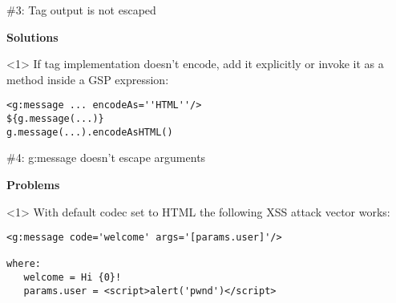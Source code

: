 \begin{frame}

  \vspace{.5cm}

  \begin{center}
    \Huge\color{red} \#3: Tag output is not escaped
  \end{center}

  \vspace{1cm}

    \Large
    \textbf{Solutions} \\[1em]

    \begin{onlyenv}<1>
      If tag implementation doesn't encode, add it explicitly or invoke it as a method inside a GSP expression:
      \begin{center}
        \begin{minipage}{.9\textwidth}
          \begin{verbatim}
<g:message ... encodeAs=''HTML''/>
${g.message(...)}
g.message(...).encodeAsHTML()
          \end{verbatim}
        \end{minipage}
      \end{center}
    \end{onlyenv}

    \vfill

\end{frame}



\begin{frame}

  \vspace{.5cm}

  \begin{center}
    \Huge\color{red} \#4: g:message doesn't escape arguments
  \end{center}

  \vspace{1cm}

    \Large
    \textbf{Problems} \\[1em]

    \begin{onlyenv}<1>
      With default codec set to HTML the following XSS attack vector works:
      \begin{center}
        \begin{minipage}{.9\textwidth}
          \begin{verbatim}
<g:message code='welcome' args='[params.user]'/>

where:
   welcome = Hi {0}!
   params.user = <script>alert('pwnd')</script>
          \end{verbatim}
        \end{minipage}
      \end{center}
    \end{onlyenv}

    \vfill

\end{frame}

